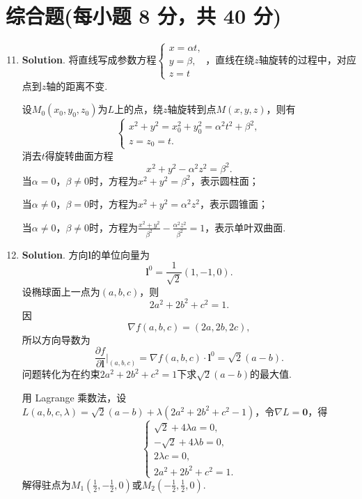 \documentclass[../main.tex]{subfiles}
\begin{document}
\section{综合题(每小题 8 分，共 40 分)}
\begin{enumerate}
    \setcounter{enumi}{10}
    \item \textbf{Solution}. 将直线写成参数方程$\begin{cases}
                  x=\alpha t, \\
                  y=\beta,    \\
                  z=t
              \end{cases}$，直线在绕$z$轴旋转的过程中，对应点到$z$轴的距离不变.

          设$M_0(x_0,y_0,z_0)$为$L$上的点，绕$z$轴旋转到点$M(x,y,z)$，则有
          \[
              \begin{cases}
                  x^2+y^2=x_0^2+y_0^2 = \alpha^2t^2+\beta^2, \\
                  z=z_0=t.
              \end{cases}
          \]
          消去$t$得旋转曲面方程
          \[
              x^2+y^2-\alpha^2z^2=\beta^2.
          \]
          当$\alpha=0$，$\beta\neq0$时，方程为$x^2+y^2=\beta^2$，表示圆柱面；

          当$\alpha\neq0$，$\beta=0$时，方程为$x^2+y^2=\alpha^2z^2$，表示圆锥面；

          当$\alpha\neq0$，$\beta\neq0$时，方程为$\frac{x^2+y^2}{\beta^2}-\frac{\alpha^2z^2}{\beta^2}=1$，表示单叶双曲面.

    \item \textbf{Solution}. 方向$\boldsymbol{l}$的单位向量为
          \[
              \boldsymbol{l}^0=\frac{1}{\sqrt{2}}\left(1,-1,0\right).
          \]
          设椭球面上一点为$(a,b,c)$，则
          \[
              2a^2+2b^2+c^2=1.
          \]
          因
          \[
              \nabla f(a,b,c)=(2a,2b,2c),
          \]
          所以方向导数为
          \[
              \frac{\partial f}{\partial \boldsymbol{l}}\bigg|_{(a,b,c)}
              =\nabla f(a,b,c)\cdot\boldsymbol{l}^0=\sqrt2(a-b).
          \]
          问题转化为在约束$2a^2+2b^2+c^2=1$下求$\sqrt2(a-b)$的最大值.

          用 Lagrange 乘数法，设$L(a,b,c,\lambda)=\sqrt2(a-b)+\lambda(2a^2+2b^2+c^2-1)$，令$\nabla L=\mathbf{0}$，得
          \[
              \begin{cases}
                  \sqrt{2}+4\lambda a=0,  \\
                  -\sqrt{2}+4\lambda b=0, \\
                  2\lambda c=0,           \\
                  2a^2+2b^2+c^2=1.
              \end{cases}
          \]
          解得驻点为$M_1\left(\frac{1}{2},-\frac{1}{2},0\right)$或$M_2\left(-\frac{1}{2},\frac{1}{2},0\right)$.


\end{enumerate}
\end{document}
